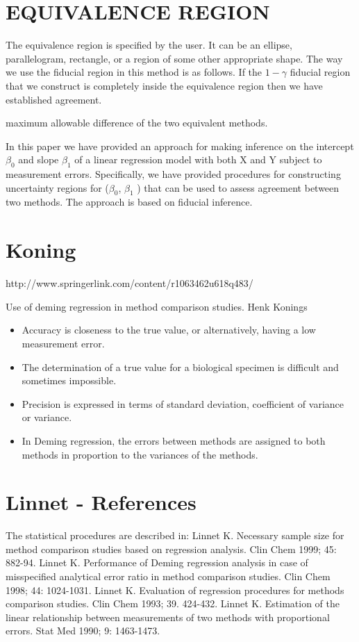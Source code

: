 \documentclass[MAIN.tex]{subfiles}
\begin{document}
\section*{EQUIVALENCE REGION}
The equivalence region is specified by the user. It can be an ellipse, parallelogram,
rectangle, or a region of some other appropriate shape. The way we use the fiducial region in this method is as follows. If
the $1−\gamma$ fiducial region that we construct is completely inside the equivalence region then we have established agreement.

maximum allowable difference of the two equivalent methods.

In this paper we have provided an approach for making inference on the intercept $\beta_0$ and slope $\beta_1$ of a linear regression
model with both X and Y subject to measurement errors. Specifically, we have provided procedures for constructing
uncertainty regions for ($\beta_0$, $\beta_1$ ) that can be used to assess agreement between two methods. The approach is based on
fiducial inference.


\section*{Koning}
http://www.springerlink.com/content/r1063462u618q483/

Use of deming regression in method comparison studies.
Henk Konings

\begin{itemize}
\item Accuracy is closeness to the true value, or alternatively, having a low measurement error.

\item The determination of a true value for a biological specimen is difficult and sometimes impossible.

\item Precision is expressed in terms of standard deviation, coefficient of variance or variance.

\item In Deming regression, the errors between methods are assigned to both methods in proportion to the variances of the methods.
\end{itemize}


	\section{Linnet - References}
	The statistical procedures are described in:
	Linnet K. Necessary sample size for method comparison studies based on regression analysis. Clin Chem 1999; 45: 882-94.
	Linnet K. Performance of Deming regression analysis in case of misspecified analytical error ratio in method comparison studies. Clin Chem 1998; 44: 1024-1031.
	Linnet K. Evaluation of regression procedures for methods comparison studies. Clin Chem 1993; 39. 424-432.
	Linnet K. Estimation of the linear relationship between measurements of two methods with proportional errors. Stat Med 1990; 9: 1463-1473.
	
\end{document}
